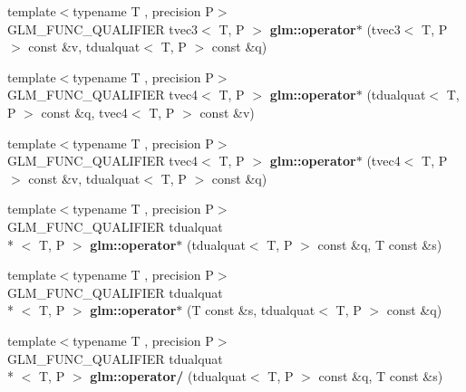 \begin{DoxyCompactItemize}
\item 
\hypertarget{namespaceglm_ad837ea15bead96f4ecb1335c61c05697}{{\footnotesize template$<$typename T , precision P$>$ }\\G\-L\-M\-\_\-\-F\-U\-N\-C\-\_\-\-Q\-U\-A\-L\-I\-F\-I\-E\-R tvec3$<$ T, P $>$ {\bfseries glm\-::operator$\ast$} (tvec3$<$ T, P $>$ const \&v, tdualquat$<$ T, P $>$ const \&q)}\label{namespaceglm_ad837ea15bead96f4ecb1335c61c05697}

\item 
\hypertarget{namespaceglm_af7e4c7f9357bbbd507b6c3e21c615155}{{\footnotesize template$<$typename T , precision P$>$ }\\G\-L\-M\-\_\-\-F\-U\-N\-C\-\_\-\-Q\-U\-A\-L\-I\-F\-I\-E\-R tvec4$<$ T, P $>$ {\bfseries glm\-::operator$\ast$} (tdualquat$<$ T, P $>$ const \&q, tvec4$<$ T, P $>$ const \&v)}\label{namespaceglm_af7e4c7f9357bbbd507b6c3e21c615155}

\item 
\hypertarget{namespaceglm_a7b2a46a8862527e45c3d7bd3fdfcfa10}{{\footnotesize template$<$typename T , precision P$>$ }\\G\-L\-M\-\_\-\-F\-U\-N\-C\-\_\-\-Q\-U\-A\-L\-I\-F\-I\-E\-R tvec4$<$ T, P $>$ {\bfseries glm\-::operator$\ast$} (tvec4$<$ T, P $>$ const \&v, tdualquat$<$ T, P $>$ const \&q)}\label{namespaceglm_a7b2a46a8862527e45c3d7bd3fdfcfa10}

\item 
\hypertarget{group__gtx__dual__quaternion_ga5251d67271c42cf52227b6254f3fc8ed}{{\footnotesize template$<$typename T , precision P$>$ }\\G\-L\-M\-\_\-\-F\-U\-N\-C\-\_\-\-Q\-U\-A\-L\-I\-F\-I\-E\-R tdualquat\\*
$<$ T, P $>$ {\bfseries glm\-::operator$\ast$} (tdualquat$<$ T, P $>$ const \&q, T const \&s)}\label{group__gtx__dual__quaternion_ga5251d67271c42cf52227b6254f3fc8ed}

\item 
\hypertarget{group__gtx__dual__quaternion_ga0aedf77f3e7d45464501570c28df0ed7}{{\footnotesize template$<$typename T , precision P$>$ }\\G\-L\-M\-\_\-\-F\-U\-N\-C\-\_\-\-Q\-U\-A\-L\-I\-F\-I\-E\-R tdualquat\\*
$<$ T, P $>$ {\bfseries glm\-::operator$\ast$} (T const \&s, tdualquat$<$ T, P $>$ const \&q)}\label{group__gtx__dual__quaternion_ga0aedf77f3e7d45464501570c28df0ed7}

\item 
\hypertarget{group__gtx__dual__quaternion_gad27b1d064624dd6ff1ecc205616323ba}{{\footnotesize template$<$typename T , precision P$>$ }\\G\-L\-M\-\_\-\-F\-U\-N\-C\-\_\-\-Q\-U\-A\-L\-I\-F\-I\-E\-R tdualquat\\*
$<$ T, P $>$ {\bfseries glm\-::operator/} (tdualquat$<$ T, P $>$ const \&q, T const \&s)}\label{group__gtx__dual__quaternion_gad27b1d064624dd6ff1ecc205616323ba}


\end{DoxyCompactItemize}
